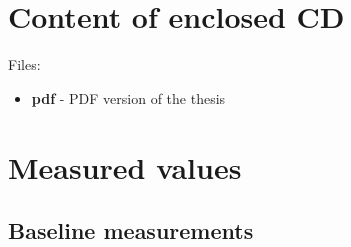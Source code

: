 





\chapter{Content of enclosed CD}
\label{appendix:cd}
Files:
\begin{itemize}
  \item \textbf{pdf} - PDF version of the thesis
\end{itemize}

\chapter{Measured values}
\label{appendix:data}
\section{Baseline measurements}
